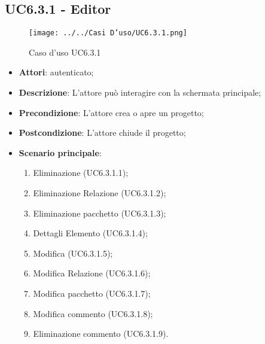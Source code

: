 \subsection{UC6.3.1 - Editor }
\label{ssec:UC6.3.1}
\begin{figure}[h!]
\centering
\texttt{[image: ../../Casi D'uso/UC6.3.1.png]}
\caption{Caso d'uso UC6.3.1}
 \end{figure}
\begin{itemize}
\item \textbf{Attori}:  autenticato;
\item \textbf{Descrizione}: L'attore può interagire con la schermata principale;
\item \textbf{Precondizione}: L'attore crea o apre un progetto;
\item \textbf{Postcondizione}: L'attore chiude il progetto;
\item \textbf{Scenario principale}: \begin{enumerate}\item Eliminazione  (UC6.3.1.1);\item Eliminazione Relazione (UC6.3.1.2);\item Eliminazione pacchetto (UC6.3.1.3);\item Dettagli Elemento (UC6.3.1.4);\item Modifica  (UC6.3.1.5);\item Modifica Relazione (UC6.3.1.6);\item Modifica pacchetto (UC6.3.1.7);\item Modifica commento (UC6.3.1.8);\item Eliminazione commento (UC6.3.1.9).
 \end{enumerate}
\end{itemize}
